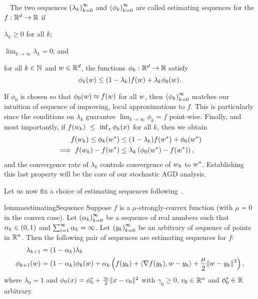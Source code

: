 \begin{definition}~\label{def:estimating_sequences}
    The two sequences \( \left(\lambda_k\right)_{k=0}^\infty \) and \( \left(\phi_k\right)_{k=0}^\infty \) are called estimating sequences for the \( f : \mathbb{R}^d \rightarrow \mathbb{R} \) if
    \begin{inparaenum}[(1)]
        \item \( \lambda_k \geq 0 \) for all \( k \);
        \item \( \lim_{k\rightarrow \infty} \lambda_k = 0 \); and
        \item for all \( k \in \mathbb{N} \) and \( w \in \mathbb{R}^d \), the functions \( \phi_k: \mathbb{R}^d \rightarrow \mathbb{R} \) satisfy
        \[ \phi_k(w) \leq (1 - \lambda_k) f(w) + \lambda_k \phi_0(w). \]
    \end{inparaenum}
\end{definition}

If \( \phi_0 \) is chosen so that \( \phi_0(w) \approx f(w) \) for all \( w \), then \( \left(\phi_k\right)_{k=0}^\infty \) matches our intuition of sequence of improving, local approximations to \( f \).
This is particularly since the conditions on \( \lambda_k \) guarantee \( \lim_{k \rightarrow \infty} \phi_k = f \) point-wise.
Finally, and most importantly, if \( f(w_k)~\leq~\inf_x \phi_k(x) \) for all \( k \), then we obtain
\begin{align*}
    f(w_k) \leq \phi_k(w^*) &\leq (1 - \lambda_k) f(w^*) + \phi_0(w^*)\\
    \implies f(w_k) - f(w^*) &\leq \lambda_k \left(\phi_0(w^*) - f(w^*)\right),
\end{align*}
and the convergence rate of \( \lambda_k \) controls convergence of \( w_k \) to \( w^* \).
Establishing this last property will be the core of our stochastic AGD analysis.

Let us now fix a choice of estimating sequences following~\citet[Lemma 2.2.2]{nesterov2004lectures}. 
\begin{restatable}{lemma}{estimatingSequence}\label{lemma:estimating-sequence}
    Suppose \( f \) is a \( \mu \)-strongly-convex function (with \( \mu = 0 \) in the convex case).
    Let \( \left(\alpha_{k}\right)_{k=0}^\infty \) be a sequence of real numbers such that \( \alpha_{k} \in (0,1) \) and \( \sum_{i=1}^\infty \alpha_{k} = \infty \). 
    Let \( \left(y_k\right)_{k=0}^\infty \) be an arbitrary of sequence of points in \( \mathbb{R}^n \).
    Then the following pair of sequences are estimating sequences for \( f \):
    \begin{align*}
        \lambda_{k+1} &= (1- \alpha_k) \lambda_k\\
        \phi_{k+1}(w) &= (1-\alpha_k) \phi_k(w) + \alpha_k \left(f(y_k) + \left\langle\nabla f(y_k), w - y_k\right\rangle + \frac{\mu}{2} \|w - y_k\|^2\right),
    \end{align*}
    where \( \lambda_0 = 1 \) and \( \phi_0(x) = \phi_0^* + \frac{\gamma_0}{2}\|x - v_0\|^2 \) with \( \gamma_0 \geq 0 \), \( v_0 \in \mathbb{R}^n \) and \( \phi_0^* \in \mathbb{R} \) arbitrary.
\end{restatable}

